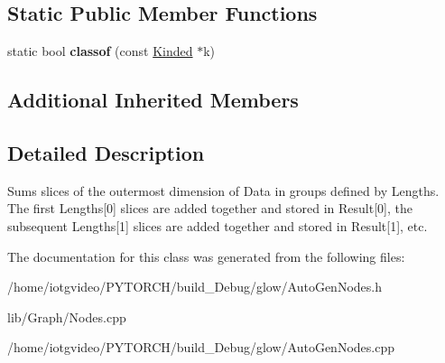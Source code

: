 \subsection*{Static Public Member Functions}
\begin{DoxyCompactItemize}
\item 
\mbox{\label{classglow_1_1_lengths_sum_node_a1953bcf25ef45579086a7cb3773e174f}} 
static bool {\bfseries classof} (const \hyperlink{classglow_1_1_kinded}{Kinded} $\ast$k)
\end{DoxyCompactItemize}
\subsection*{Additional Inherited Members}


\subsection{Detailed Description}
Sums slices of the outermost dimension of Data in groups defined by Lengths. The first Lengths\mbox{[}0\mbox{]} slices are added together and stored in Result\mbox{[}0\mbox{]}, the subsequent Lengths\mbox{[}1\mbox{]} slices are added together and stored in Result\mbox{[}1\mbox{]}, etc. 

The documentation for this class was generated from the following files\+:\begin{DoxyCompactItemize}
\item 
/home/iotgvideo/\+P\+Y\+T\+O\+R\+C\+H/build\+\_\+\+Debug/glow/Auto\+Gen\+Nodes.\+h\item 
lib/\+Graph/Nodes.\+cpp\item 
/home/iotgvideo/\+P\+Y\+T\+O\+R\+C\+H/build\+\_\+\+Debug/glow/Auto\+Gen\+Nodes.\+cpp\end{DoxyCompactItemize}
